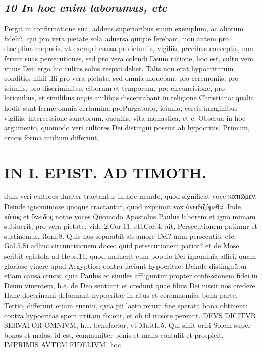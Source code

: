 \documentclass{article}
\begin{document}
\begin{pages}
\subsection*{\textit{10 In hoc enim laboramus, etc }}\pstart Pergit in confirmatione sua, addens superioribus suum exemplum, ac aliorum fideliũ, qui pro vera pietate sola aduersa quique ferebant, non autem pro disciplina corporis, vt exempli causa pro ieiuniis, vigiliis, precibus conceptis, non ferunt suas persecutiones, sed pro vera colendi Deum ratione, hoc est, cultu vero vnius Dei: ergo hic cultus solus respici debet. Talis non erat hypocritarum conditio, nihil illi pro vera pietate, sed omnia mouebant pro ceremoniis, pro ieiuniis, pro discriminibus  ciborum et temporum, pro circuncisione, pro lotionibus, et similibus nugis anilibus disceptabant in religione Christiana: qualia hodie sunt ferme omnia certamina proPurgatorio, ieiunio, cereis imaginibus  vigiliis, intercessione sanctorum, cucullis, vita monastica, et c. Obserua in hoc argumento, quomodo veri cultores Dei distingui possint ab hypocritis. Primum, crucis forma multum differunt,  \pend
\section*{IN I. EPIST. AD TIMOTH. }
\marginpar{[ p.103 ]}\pstart dum veri cultores duriter tractantur in hoc mundo, quod significat voce κοπιῶμεν. Deinde ignominiose quoque tractantur, quod exprimit vox ὀνειδιζόμεθα. Inde κόπος et ὄνειδος notae voces  \pend\pstart Quomodo Apostolus Paulus laborem et igno mimam subiuerit, pro vera pietate, vide 2.Cor.11. et1Cor.4. ait, Persecutionem patimur et sustinemus. Rom.8. Quis nos separabit ab amore Dei? num persecutio, etc. Gal.5.Si adhuc circuncisionem doceo quid persecutionem patior? et de Mose scribit epistola ad Hebr.11. quod maluerit cum populo Dei ignominia affici, quam gloriose viuere apud Aegyptios: contra faciunt hypocritae.  \pend\pstart Deinde distinguütur etiam causa crucis, quia Paulus et similes affliguntur propter confessionem fidei in Deum viuentem, h.e. de Deo sentiunt et credunt quae filius Dei iussit nos credere. Hanc doctrinami deformant hypocritae in ritus et ceremnomias bona parte.  \pend\pstart Tertio, differunt etiam euentu, quia pii laeto rerum fine sperata bona obtinent: contra hypocritae spem irritam fouent, et ob id misere pereunt.  \pend\pstart DEVS DICITVR SERVATOR OMNIVM, h.e. benefactor, vt Matth.5. Qui sinit oriri Solem super bonos et malos, id est, communiter bonis et malis contulit et prospicit. IMPRIMIS AVTEM FIDELIVM, hoc  \pend

\end{pages}
\end{document}
